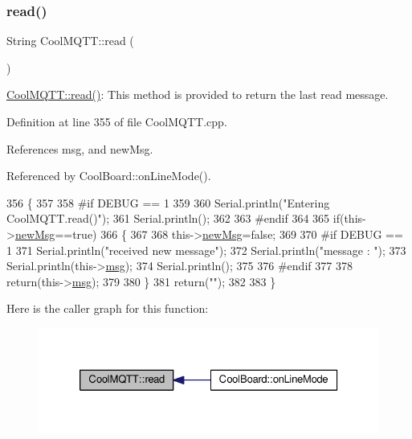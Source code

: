 \subsubsection{\texorpdfstring{read()}{read()}}
{\footnotesize\ttfamily String Cool\+M\+Q\+T\+T\+::read (\begin{DoxyParamCaption}{ }\end{DoxyParamCaption})}

\hyperlink{classCoolMQTT_ae3c18f6ae9723746d32765f1c8f176ca}{Cool\+M\+Q\+T\+T\+::read()}\+: This method is provided to return the last read message. 

Definition at line 355 of file Cool\+M\+Q\+T\+T.\+cpp.



References msg, and new\+Msg.



Referenced by Cool\+Board\+::on\+Line\+Mode().


\begin{DoxyCode}
356 \{   
357 
358 \textcolor{preprocessor}{#if DEBUG == 1 }
359 
360     Serial.println(\textcolor{stringliteral}{"Entering CoolMQTT.read()"});
361     Serial.println();
362 
363 \textcolor{preprocessor}{#endif }
364 
365     \textcolor{keywordflow}{if}(this->\hyperlink{classCoolMQTT_a3240388137b885775aadf38e96b24c6b}{newMsg}==\textcolor{keyword}{true})
366     \{
367         
368         this->\hyperlink{classCoolMQTT_a3240388137b885775aadf38e96b24c6b}{newMsg}=\textcolor{keyword}{false};
369 
370 \textcolor{preprocessor}{#if DEBUG == 1 }
371         Serial.println(\textcolor{stringliteral}{"received new message"});
372         Serial.println(\textcolor{stringliteral}{"message : "});
373         Serial.println(this->\hyperlink{classCoolMQTT_af6b19e7074dbbb4ae493c44dcb53f7ff}{msg});
374         Serial.println();
375 
376 \textcolor{preprocessor}{#endif}
377 
378         \textcolor{keywordflow}{return}(this->\hyperlink{classCoolMQTT_af6b19e7074dbbb4ae493c44dcb53f7ff}{msg});
379         
380     \}
381     \textcolor{keywordflow}{return}(\textcolor{stringliteral}{""});
382 
383 \}
\end{DoxyCode}
Here is the caller graph for this function\+:
\nopagebreak
\begin{figure}[H]
\begin{center}
\leavevmode
\includegraphics[width=326pt]{classCoolMQTT_ae3c18f6ae9723746d32765f1c8f176ca_icgraph}
\end{center}
\end{figure}
\mbox{\label{classCoolMQTT_a5d003307eff78efbd585e42b43b72b6d}} 
